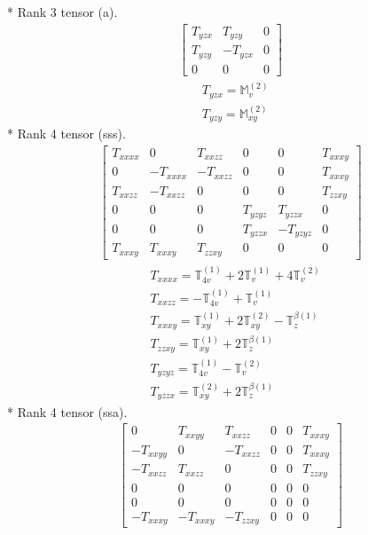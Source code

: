 \documentclass[fleqn,8pt,landscape]{jsarticle}
\begin{document}
* Rank 3 tensor (a).
\begin{align*}
\begin{bmatrix} T_{yzx} & T_{yzy} & 0 \\ T_{yzy} & - T_{yzx} & 0 \\ 0 & 0 & 0 \end{bmatrix}
\end{align*}
\begin{align*}
& T_{yzx} = \mathbb{M}_{v}^{(2)} \\
& T_{yzy} = \mathbb{M}_{xy}^{(2)}
\end{align*}
* Rank 4 tensor (sss).
\begin{align*}
\begin{bmatrix} T_{xxxx} & 0 & T_{xxzz} & 0 & 0 & T_{xxxy} \\ 0 & - T_{xxxx} & - T_{xxzz} & 0 & 0 & T_{xxxy} \\ T_{xxzz} & - T_{xxzz} & 0 & 0 & 0 & T_{zzxy} \\ 0 & 0 & 0 & T_{yzyz} & T_{yzzx} & 0 \\ 0 & 0 & 0 & T_{yzzx} & - T_{yzyz} & 0 \\ T_{xxxy} & T_{xxxy} & T_{zzxy} & 0 & 0 & 0 \end{bmatrix}
\end{align*}
\begin{align*}
& T_{xxxx} = \mathbb{T}_{4v}^{(1)} + 2 \mathbb{T}_{v}^{(1)} + 4 \mathbb{T}_{v}^{(2)} \\
& T_{xxzz} = - \mathbb{T}_{4v}^{(1)} + \mathbb{T}_{v}^{(1)} \\
& T_{xxxy} = \mathbb{T}_{xy}^{(1)} + 2 \mathbb{T}_{xy}^{(2)} - \mathbb{T}_{z}^{\beta(1)} \\
& T_{zzxy} = \mathbb{T}_{xy}^{(1)} + 2 \mathbb{T}_{z}^{\beta(1)} \\
& T_{yzyz} = \mathbb{T}_{4v}^{(1)} - \mathbb{T}_{v}^{(2)} \\
& T_{yzzx} = \mathbb{T}_{xy}^{(2)} + 2 \mathbb{T}_{z}^{\beta(1)}
\end{align*}
* Rank 4 tensor (ssa).
\begin{align*}
\begin{bmatrix} 0 & T_{xxyy} & T_{xxzz} & 0 & 0 & T_{xxxy} \\ - T_{xxyy} & 0 & - T_{xxzz} & 0 & 0 & T_{xxxy} \\ - T_{xxzz} & T_{xxzz} & 0 & 0 & 0 & T_{zzxy} \\ 0 & 0 & 0 & 0 & 0 & 0 \\ 0 & 0 & 0 & 0 & 0 & 0 \\ - T_{xxxy} & - T_{xxxy} & - T_{zzxy} & 0 & 0 & 0 \end{bmatrix}
\end{align*}
\end{document}
